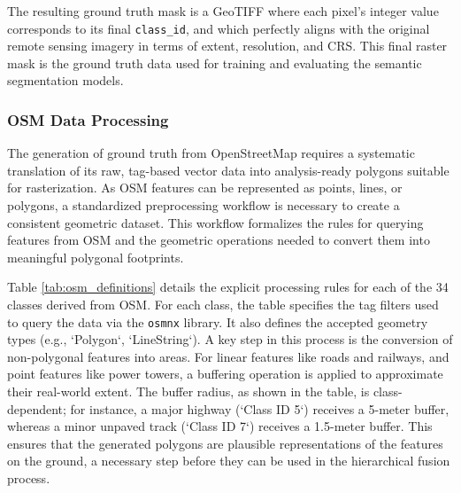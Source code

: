 \documentclass{report}
\begin{document}
The resulting ground truth mask is a GeoTIFF where each pixel's integer value corresponds to its final \texttt{class\_id}, and which perfectly aligns with the original remote sensing imagery in terms of extent, resolution, and CRS. This final raster mask is the ground truth data used for training and evaluating the semantic segmentation models.






\subsubsection{OSM Data Processing}
The generation of ground truth from OpenStreetMap requires a systematic translation of its raw, tag-based vector data into analysis-ready polygons suitable for rasterization. As OSM features can be represented as points, lines, or polygons, a standardized preprocessing workflow is necessary to create a consistent geometric dataset. This workflow formalizes the rules for querying features from OSM and the geometric operations needed to convert them into meaningful polygonal footprints.

Table \ref{tab:osm_definitions} details the explicit processing rules for each of the 34 classes derived from OSM. For each class, the table specifies the tag filters used to query the data via the \texttt{osmnx} library. It also defines the accepted geometry types (e.g., `Polygon`, `LineString`). A key step in this process is the conversion of non-polygonal features into areas. For linear features like roads and railways, and point features like power towers, a buffering operation is applied to approximate their real-world extent. The buffer radius, as shown in the table, is class-dependent; for instance, a major highway (`Class ID 5`) receives a 5-meter buffer, whereas a minor unpaved track (`Class ID 7`) receives a 1.5-meter buffer. This ensures that the generated polygons are plausible representations of the features on the ground, a necessary step before they can be used in the hierarchical fusion process.
\end{document}
